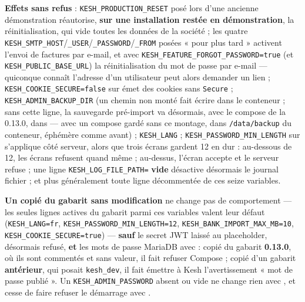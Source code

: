 \documentclass[a4paper,11pt,oneside]{article}
\begin{document}
\begin{keshwarning}
\textbf{Effets sans refus} : \texttt{KESH\_PRODUCTION\_RESET} posé lors d'une ancienne démonstration réautorise, \textbf{sur une installation restée en démonstration}, la réinitialisation, qui vide toutes les données de la société ; les quatre \texttt{KESH\_SMTP\_HOST}/\texttt{\_USER}/\texttt{\_PASSWORD}/\texttt{\_FROM} posées « pour plus tard » activent l'envoi de factures par e-mail, et avec \texttt{KESH\_FEATURE\_FORGOT\_PASSWORD=true} (et \texttt{KESH\_PUBLIC\_BASE\_URL}) la réinitialisation du mot de passe par e-mail --- quiconque connaît l'adresse d'un utilisateur peut alors demander un lien ; \texttt{KESH\_COOKIE\_SECURE=false} sur  émet des cookies sans \texttt{Secure} ; \texttt{KESH\_ADMIN\_BACKUP\_DIR} (un chemin non monté fait écrire dans le conteneur ; sans cette ligne, la sauvegarde pré-import va désormais, avec le compose de la 0.13.0, dans  --- avec un compose gardé sans ce montage, dans \texttt{/data/backup} du conteneur, éphémère comme avant) ; \texttt{KESH\_LANG} ; \texttt{KESH\_PASSWORD\_MIN\_LENGTH} sur  s'applique côté serveur, alors que trois écrans gardent 12 en dur : au-dessous de 12, les écrans refusent quand même ; au-dessus, l'écran accepte et le serveur refuse ; une ligne \texttt{KESH\_LOG\_FILE\_PATH=} \textbf{vide} désactive désormais le journal fichier ; et plus généralement toute ligne décommentée de ces seize variables.

\textbf{Un  copié du gabarit sans modification} ne change pas de comportement --- les seules lignes actives du gabarit parmi ces variables valent leur défaut (\texttt{KESH\_LANG=fr}, \texttt{KESH\_PASSWORD\_MIN\_LENGTH=12}, \texttt{KESH\_BANK\_IMPORT\_MAX\_MB=10}, \texttt{KESH\_COOKIE\_SECURE=true}) --- \textbf{sauf} le secret JWT laissé au placeholder, désormais refusé, \textbf{et} les mots de passe MariaDB avec  : copié du gabarit \textbf{0.13.0}, où ils sont commentés et sans valeur, il fait refuser Compose ; copié d'un gabarit \textbf{antérieur}, qui posait \texttt{kesh\_dev}, il fait émettre à Kesh l'avertissement « mot de passe publié ». Un \texttt{KESH\_ADMIN\_PASSWORD} absent ou vide ne change rien avec , et cesse de faire refuser le démarrage avec .
\end{keshwarning}
\end{document}
